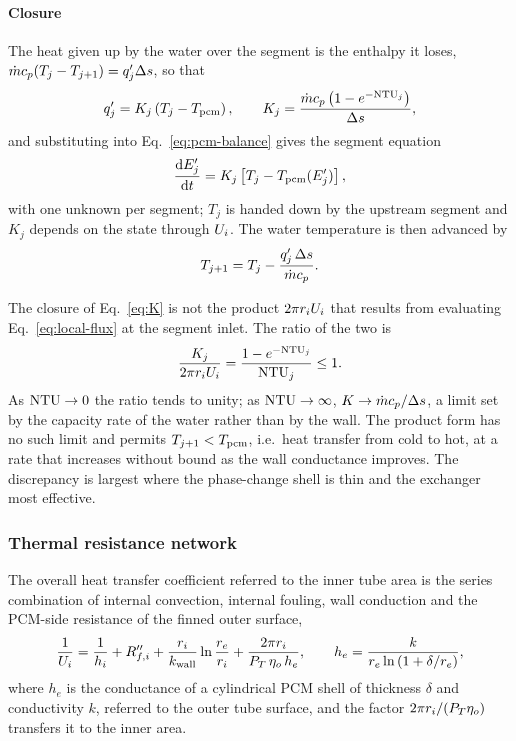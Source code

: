 \paragraph{Closure} The heat given up by the water over the segment is the
enthalpy it loses, $\dot m c_p(T_j-T_{j+1})=q'_j\Delta s$, so that
\begin{equation}
  q'_j=K_j\left(T_j-T_{\mathrm{pcm}}\right),
  \qquad
  K_j=\frac{\dot m c_{p}\left(1-e^{-\mathrm{NTU}_j}\right)}{\Delta s},
  \label{eq:K}
\end{equation}
and substituting into Eq.~\eqref{eq:pcm-balance} gives the segment equation
\begin{equation}
  \frac{\mathrm{d}E'_j}{\mathrm{d}t}=K_j\left[T_j-T_{\mathrm{pcm}}(E'_j)\right],
  \label{eq:ode}
\end{equation}
with one unknown per segment; $T_j$ is handed down by the upstream segment and
$K_j$ depends on the state through $U_{i}$. The water temperature is then
advanced by
\begin{equation}
  T_{j+1}=T_j-\frac{q'_j\,\Delta s}{\dot m c_{p}} .
  \label{eq:T-march}
\end{equation}

The closure of Eq.~\eqref{eq:K} is not the product
$2\pi r_iU_{i}$ that results from evaluating Eq.~\eqref{eq:local-flux} at the
segment inlet. The ratio of the two is
\begin{equation}
  \frac{K_j}{2\pi r_iU_{i}}=\frac{1-e^{-\mathrm{NTU}_j}}{\mathrm{NTU}_j}\le 1 .
  \label{eq:K-ratio}
\end{equation}
As $\mathrm{NTU}\to0$ the ratio tends to unity; as $\mathrm{NTU}\to\infty$, $K\to\dot m
c_p/\Delta s$, a limit set by the capacity rate of the water rather than by the
wall. The product form has no such limit and permits $T_{j+1}<T_{\mathrm{pcm}}$, i.e.\
heat transfer from cold to hot, at a rate that increases without bound as the
wall conductance improves. The discrepancy is largest where the phase-change
shell is thin and the exchanger most effective.

\subsubsection{Thermal resistance network}
\label{sec:network}

The overall heat transfer coefficient referred to the inner tube area is the
series combination of internal convection, internal fouling, wall conduction
and the PCM-side resistance of the finned outer surface,
\begin{equation}
  \frac{1}{U_{i}}=\frac{1}{h_i}+R''_{f,i}+\frac{r_i}{k_\mathrm{wall}}\ln\frac{r_e}{r_i}
  +\frac{2\pi r_i}{P_T\,\eta_{o}\,h_e},
  \qquad
  h_e=\frac{k}{r_e\ln\left(1+\delta/r_e\right)},
  \label{eq:Ui}
\end{equation}
where $h_e$ is the conductance of a cylindrical PCM shell of thickness $\delta$
and conductivity $k$, referred to the outer tube surface, and the factor
$2\pi r_i/(P_T\eta_{o})$ transfers it to the inner area.

